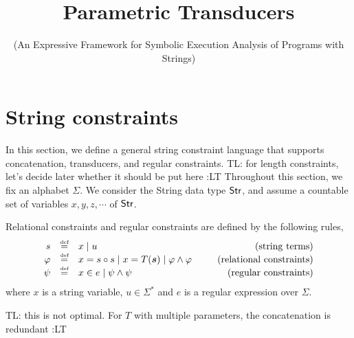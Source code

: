 \documentclass{llncs}
\newcommand{\zhilin}[1]{\color{brown} {ZL: #1 :LZ} \color{black}}
\newcommand{\tl}[1]{\color{blue} {TL: #1 :LT} \color{black}}
\newcommand{\zhilin}[1]{}
\newcommand{\tl}[1]{}
\newcommand{\concat} {\circ}
\newcommand{\str} {{\sf Str}}
\begin{document}
\title{Parametric Transducers}
\subtitle{(An Expressive Framework for Symbolic 
Execution Analysis of Programs with Strings)}

\author{}
\institute{}

\maketitle

















\section{String constraints} \label{sec-core}

In this section, we define a general string constraint language that supports
concatenation, transducers, and regular constraints.
\tl{for length constraints, let's decide later whether it should be put here}
Throughout this section, we fix an alphabet $\Sigma$.
We consider the String data type $\str$, and assume a countable set of variables
$x, y, z, \cdots$ of $\str$.


\begin{definition}
	Relational constraints and regular constraints are defined by the following rules,
	\[
	\begin{array}{r c l cr}
	s &\eqdef & x \mid u & \ \ & \mbox{(string terms)}\\
	\varphi &\eqdef & x = s \concat s  \mid  x = T(\vec{s}) \mid \varphi \wedge \varphi & \ \ & \mbox{(relational constraints)}\\
	\psi & \eqdef & x \in e \mid \psi \wedge \psi %
	& \ \ & \mbox{(regular constraints)} \\
	\end{array}
	\]
	where $x$ is a string variable, $u \in \Sigma^\ast$ and $e$ is a regular expression over $\Sigma$.
\end{definition}
\tl{this is not optimal. For $T$ with multiple parameters, the concatenation is redundant}
\end{document}
